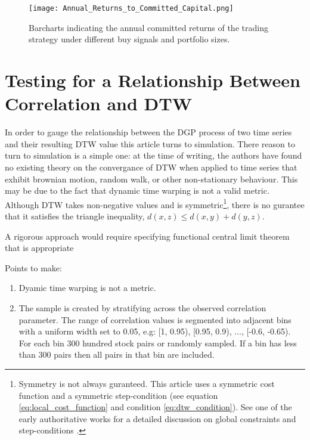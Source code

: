 \documentclass[12pt]{article}
\begin{document}
\begin{landscape}
    \begin{figure}[hp]
        \texttt{[image: Annual\_Returns\_to\_Committed\_Capital.png]}
        \caption{Barcharts indicating the annual committed returns of the trading strategy under different buy signals and portfolio sizes.}
        \label{fig:annual_returns_to_committed_capital_by_buy_signal}
    \end{figure}
\end{landscape}

\section{Testing for a Relationship Between Correlation and DTW} \label{sec:Corr_and_DTW_Relationship}

In order to gauge the relationship between the DGP process of two time series and their resulting DTW value this article turns to simulation. There reason to turn to simulation is a simple one: at the time of writing, the authors have found no existing theory on the convergance of DTW when applied to time series that exhibit brownian motion, random walk, or other non-stationary behaviour. This may be due to the fact that dynamic time warping is not a valid metric. Although DTW takes non-negative values and is symmetric\footnote{Symmetry is not always guranteed. This article uses a symmetric cost function and a symmetric step-condition (see equation \ref{eq:local_cost_function} and condition \ref{eq:dtw_condition}). See one of the early authoritative works for a detailed discussion on global constraints and step-conditions \cite{SakoeChiba_IEEE_1978}.}, there is no gurantee that it satisfies the triangle inequality, $d(x, z) \leq d(x, y) + d(y, z)$. 

A rigorous approach would require specifying  functional central limit theorem that is appropriate 

Points to make:
\begin{enumerate}
    \item Dyamic time warping is not a metric. 
    \item The sample is created by stratifying across the observed correlation parameter. The range of correlation values is segmented into adjacent bins with a uniform width set to 0.05, e.g: [1, 0.95), [0.95, 0.9), ..., [-0.6, -0.65). For each bin 300 hundred stock pairs or randomly sampled. If a bin has less than 300 pairs then all pairs in that bin are included.
\end{enumerate}
\end{document}
